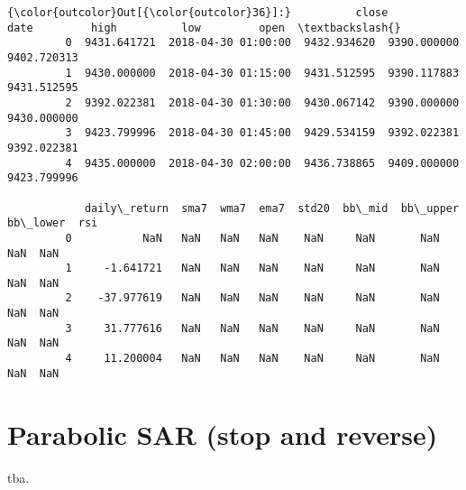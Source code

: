 \documentclass[11pt]{article}
\begin{document}
\begin{Verbatim}[commandchars=\\\{\}]
{\color{outcolor}Out[{\color{outcolor}36}]:}          close                 date         high          low         open  \textbackslash{}
         0  9431.641721  2018-04-30 01:00:00  9432.934620  9390.000000  9402.720313   
         1  9430.000000  2018-04-30 01:15:00  9431.512595  9390.117883  9431.512595   
         2  9392.022381  2018-04-30 01:30:00  9430.067142  9390.000000  9430.000000   
         3  9423.799996  2018-04-30 01:45:00  9429.534159  9392.022381  9392.022381   
         4  9435.000000  2018-04-30 02:00:00  9436.738865  9409.000000  9423.799996   
         
            daily\_return  sma7  wma7  ema7  std20  bb\_mid  bb\_upper  bb\_lower  rsi  
         0           NaN   NaN   NaN   NaN    NaN     NaN       NaN       NaN  NaN  
         1     -1.641721   NaN   NaN   NaN    NaN     NaN       NaN       NaN  NaN  
         2    -37.977619   NaN   NaN   NaN    NaN     NaN       NaN       NaN  NaN  
         3     31.777616   NaN   NaN   NaN    NaN     NaN       NaN       NaN  NaN  
         4     11.200004   NaN   NaN   NaN    NaN     NaN       NaN       NaN  NaN  
\end{Verbatim}
            
    \hypertarget{parabolic-sar-stop-and-reverse}{%
\section{Parabolic SAR (stop and
reverse)}\label{parabolic-sar-stop-and-reverse}}

    tba.


    
    
    
    
\end{document}
